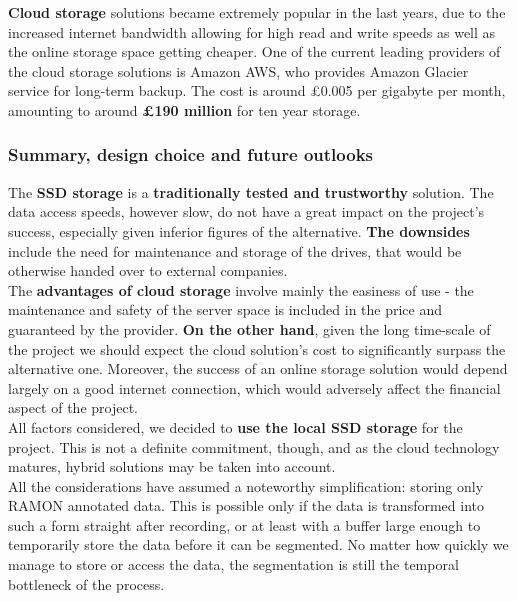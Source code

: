 \documentclass[a4paper, 11pt]{article}
\numberwithin{equation}{section}
\begin{document}
		\noindent \textbf{Cloud storage} solutions became extremely popular in the last years, due to the increased internet bandwidth allowing for high read and write speeds as well as the online storage space getting cheaper. One of the current leading providers of the cloud storage solutions is Amazon AWS, who provides Amazon Glacier service for long-term backup. The cost is around \pounds0.005 per gigabyte per month, amounting to around \textbf{\pounds190 million} for ten year storage. \\
		
		\subsubsection{Summary, design choice and future outlooks}
		
		\noindent The \textbf{SSD storage} is a \textbf{traditionally tested and trustworthy} solution. The data access speeds, however slow, do not have a great impact on the project's success, especially given inferior figures of the alternative.	\textbf{The downsides} include the need for maintenance and storage of the drives, that would be otherwise handed over to external companies. \\
		
		\noindent The \textbf{advantages of cloud storage} involve mainly the easiness of use - the maintenance and safety of the server space is included in the price and guaranteed by the provider. \textbf{On the other hand}, given the long time-scale of the project we should expect the cloud solution's cost to significantly surpass the alternative one. Moreover, the success of an online storage solution would depend largely on a good internet connection, which would adversely affect the financial aspect of the project. \\
		
		\noindent All factors considered, we decided to \textbf{use the local SSD storage} for the project. This is not a definite commitment, though, and as the cloud technology matures, hybrid solutions may be taken into account. \\
		
		\noindent All the considerations have assumed a noteworthy simplification: storing only RAMON annotated data. This is possible only if the data is transformed into such a form straight after recording, or at least with a buffer large enough to temporarily store the data before it can be segmented. No matter how quickly we manage to store or access the data, the segmentation is still the temporal bottleneck of the process. \\
		
\end{document}
